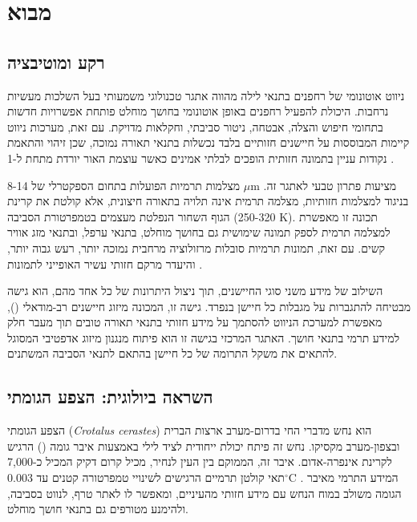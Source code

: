 
\section{מבוא}
\label{sec:ch01_intro}

\subsection{רקע ומוטיבציה}
\label{sec:ch01_background}

ניווט אוטונומי של רחפנים בתנאי לילה מהווה אתגר טכנולוגי משמעותי בעל השלכות מעשיות נרחבות. היכולת להפעיל רחפנים באופן אוטונומי בחושך מוחלט פותחת אפשרויות חדשות בתחומי חיפוש והצלה, אבטחה, ניטור סביבתי, וחקלאות מדויקת. עם זאת, מערכות ניווט קיימות המבוססות על חיישנים חזותיים בלבד נכשלות בתנאי תאורה נמוכה, שכן זיהוי והתאמת נקודות עניין בתמונה חזותית הופכים לבלתי אמינים כאשר עוצמת האור יורדת מתחת ל-1  \cite{MurArtal2015ORB}.

מצלמות תרמיות הפועלות בתחום הספקטרלי של 8-14 $\mu$m מציעות פתרון טבעי לאתגר זה. בניגוד למצלמות חזותיות, מצלמה תרמית אינה תלויה בתאורה חיצונית, אלא קולטת את קרינת הגוף השחור הנפלטת מעצמים בטמפרטורת הסביבה (250-320 K). תכונה זו מאפשרת למצלמה תרמית לספק תמונה שימושית גם בחושך מוחלט, בתנאי ערפל, ובתנאי מזג אוויר קשים. עם זאת, תמונות תרמיות סובלות מרזולוציה מרחבית נמוכה יותר, רעש גבוה יותר, והיעדר מרקם חזותי עשיר האופייני לתמונות  \cite{GriffithBatEcholocation}.

השילוב של מידע משני סוגי החיישנים, תוך ניצול היתרונות של כל אחד מהם, הוא גישה מבטיחה להתגברות על מגבלות כל חיישן בנפרד. גישה זו, המכונה מיזוג חיישנים רב-מודאלי (), מאפשרת למערכת הניווט להסתמך על מידע חזותי בתנאי תאורה טובים תוך מעבר חלק למידע תרמי בתנאי חושך. האתגר המרכזי בגישה זו הוא פיתוח מנגנון מיזוג אדפטיבי המסוגל להתאים את משקל התרומה של כל חיישן בהתאם לתנאי הסביבה המשתנים.

\subsection{השראה ביולוגית: הצפע הגומתי}
\label{sec:ch01_bio_inspiration}

הצפע הגומתי (\emph{Crotalus cerastes}) הוא נחש מדברי החי בדרום-מערב ארצות הברית ובצפון-מערב מקסיקו. נחש זה פיתח יכולת ייחודית לציד לילי באמצעות איבר גומה () הרגיש לקרינת אינפרה-אדום. איבר זה, הממוקם בין העין לנחיר, מכיל קרום דקיק המכיל כ-7,000 תאי קולטן תרמיים הרגישים לשינויי טמפרטורה קטנים עד 0.003$^{\circ}$C \cite{Simmons1979BatSonar}. המידע התרמי מאיבר הגומה משולב במוח הנחש עם מידע חזותי מהעיניים, ומאפשר לו לאתר טרף, לנווט בסביבה, ולהימנע מטורפים גם בתנאי חושך מוחלט.

